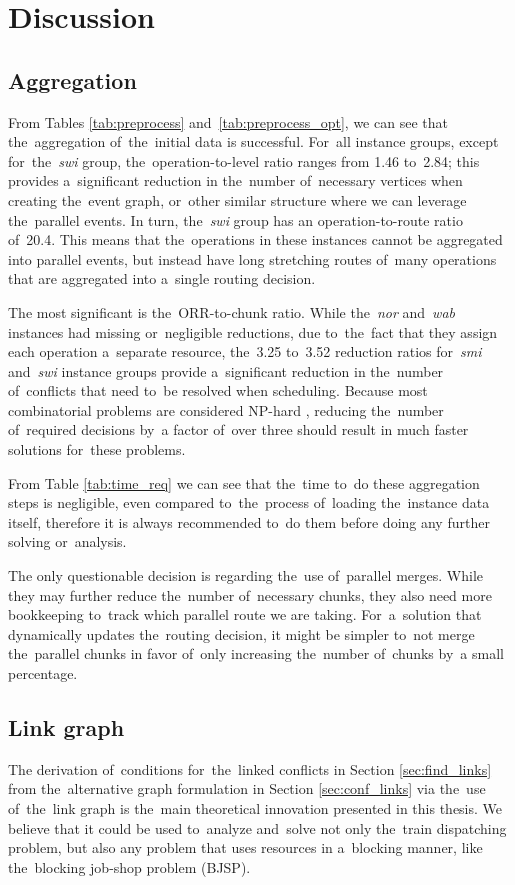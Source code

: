 \chapter{Discussion}
\label{chap:discuss}

\section{Aggregation}
From Tables \ref{tab:preprocess} and~\ref{tab:preprocess_opt}, we can see that the~aggregation of~the~initial data is successful. For~all instance groups, except for~the~\emph{swi} group, the~operation-to-level ratio ranges from 1.46 to~2.84; this provides a~significant reduction in the~number of~necessary vertices when creating the~event graph, or~other similar structure where we can leverage the~parallel events. In turn, the~\emph{swi} group has an operation-to-route ratio of~20.4. This means that the~operations in these instances cannot be aggregated into parallel events, but instead have long stretching routes of~many operations that are aggregated into a~single routing decision.

The most significant is the~ORR-to-chunk ratio. While the~\emph{nor} and~\emph{wab} instances had missing or~negligible reductions, due to~the~fact that they assign each operation a~separate resource, the~3.25 to~3.52 reduction ratios for~\emph{smi} and~\emph{swi} instance groups provide a~significant reduction in the~number of~conflicts that need to~be resolved when scheduling. Because most combinatorial problems are considered NP-hard \cite{garey1979computers}, reducing the~number of~required decisions by~a factor of~over three should result in much faster solutions for~these problems.

From Table \ref{tab:time_req} we can see that the~time to~do these aggregation steps is negligible, even compared to~the~process of~loading the~instance data itself, therefore it is always recommended to~do them before doing any further solving or~analysis.

The only questionable decision is regarding the~use of~parallel merges. While they may further reduce the~number of~necessary chunks, they also need more bookkeeping to~track which parallel route we are taking. For~a~solution that dynamically updates the~routing decision, it might be simpler to~not merge the~parallel chunks in favor of~only increasing the~number of~chunks by~a small percentage.

\section{Link graph}
The derivation of~conditions for~the~linked conflicts in Section \ref{sec:find_links} from the~alternative graph formulation in Section \ref{sec:conf_links} via the~use of~the~link graph is the~main theoretical innovation presented in this thesis. We believe that it could be used to~analyze and~solve not only the~train dispatching problem, but also any problem that uses resources in a~blocking manner, like the~blocking job-shop problem (BJSP).


